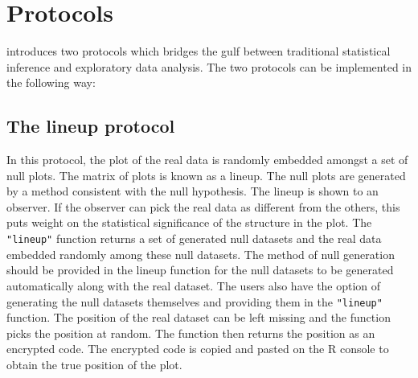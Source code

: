 \section{Protocols}\label{protocols}

\cite{buja:2009} introduces two protocols which bridges the gulf between traditional statistical inference and exploratory data analysis. The two protocols can be implemented in the following way:

\subsection{The lineup protocol}\label{the-lineup-protocol}

In this protocol, the plot of the real data is randomly embedded amongst
a set of null plots. The matrix of plots is known as a lineup. The null
plots are generated by a method consistent with the null hypothesis. The
lineup is shown to an observer. If the observer can pick the real data
as different from the others, this puts weight on the statistical
significance of the structure in the plot. The \texttt{"lineup"}
function returns a set of generated null datasets and the real data
embedded randomly among these null datasets. The method of null
generation should be provided in the lineup function for the null
datasets to be generated automatically along with the real dataset. The
users also have the option of generating the null datasets themselves
and providing them in the \texttt{"lineup"} function. The position of
the real dataset can be left missing and the function picks the position
at random. The function then returns the position as an encrypted code.
The encrypted code is copied and pasted on the R console to obtain the
true position of the plot.


